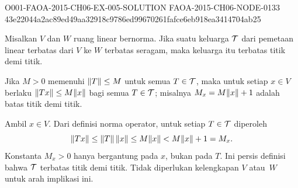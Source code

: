 \begin{o001solution}
  {O001-FAOA-2015-CH06-EX-005-SOLUTION}
  {FAOA-2015-CH06-NODE-0133}
  {43e22044a2ac89ed49aa32918c9786ed99670261fafce6eb918ea3414704ab25}
\begin{o001statement}
\label{C070114} Misalkan $V$ dan $W$ ruang linear bernorma. Jika suatu keluarga $\mathcal{T}$ dari
pemetaan linear terbatas dari $V$ ke $W$ terbatas seragam, maka keluarga itu terbatas titik demi titik.
\end{o001statement}
\begin{o001answer}
Jika $M>0$ memenuhi $\lVert T\rVert\le M$ untuk semua $T\in\mathcal{T}$, maka untuk
setiap $x\in V$ berlaku $\lVert Tx\rVert\le M\lVert x\rVert$ bagi semua
$T\in\mathcal{T}$; misalnya $M_x=M\lVert x\rVert+1$ adalah batas titik demi titik.
\end{o001answer}
\begin{o001proof}
Ambil $x\in V$. Dari definisi norma operator, untuk setiap
$T\in\mathcal{T}$ diperoleh
\[
  \lVert Tx\rVert\le\lVert T\rVert\,\lVert x\rVert\le M\lVert x\rVert<M\lVert x\rVert+1=M_x.
\]
Konstanta $M_x>0$ hanya bergantung pada $x$, bukan pada $T$. Ini persis
definisi bahwa $\mathcal{T}$ terbatas titik demi titik. Tidak diperlukan
kelengkapan $V$ atau~$W$ untuk arah implikasi ini.
\end{o001proof}
\end{o001solution}

